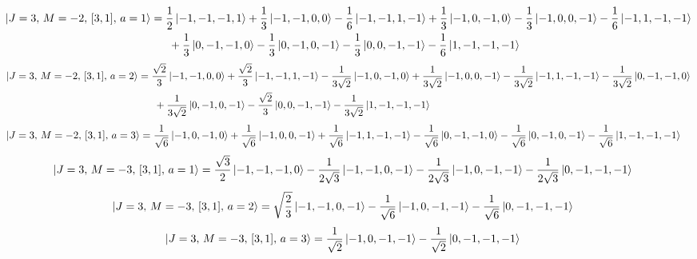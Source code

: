 \documentclass{article}
\begin{document}
{\small
\begin{equation*}
\begin{aligned}
\ket{J=3,\,M=-2,\,[3,1],\,a=1} = \; &\frac{1}{2} \ket{-1,-1,-1,1} + \frac{1}{3} \ket{-1,-1,0,0} - \frac{1}{6} \ket{-1,-1,1,-1} + \frac{1}{3} \ket{-1,0,-1,0} - \frac{1}{3} \ket{-1,0,0,-1} - \frac{1}{6} \ket{-1,1,-1,-1} \\
  & \; + \frac{1}{3} \ket{0,-1,-1,0} - \frac{1}{3} \ket{0,-1,0,-1} - \frac{1}{3} \ket{0,0,-1,-1} - \frac{1}{6} \ket{1,-1,-1,-1}
\end{aligned}
\end{equation*}}
{\small
\begin{equation*}
\begin{aligned}
\ket{J=3,\,M=-2,\,[3,1],\,a=2} = \; &\frac{\sqrt{2}}{3} \ket{-1,-1,0,0} + \frac{\sqrt{2}}{3} \ket{-1,-1,1,-1} - \frac{1}{3\sqrt{2}} \ket{-1,0,-1,0} + \frac{1}{3\sqrt{2}} \ket{-1,0,0,-1} - \frac{1}{3\sqrt{2}} \ket{-1,1,-1,-1} - \frac{1}{3\sqrt{2}} \ket{0,-1,-1,0} \\
  & \; + \frac{1}{3\sqrt{2}} \ket{0,-1,0,-1} - \frac{\sqrt{2}}{3} \ket{0,0,-1,-1} - \frac{1}{3\sqrt{2}} \ket{1,-1,-1,-1}
\end{aligned}
\end{equation*}}
\begin{equation*}
\begin{aligned}
\ket{J=3,\,M=-2,\,[3,1],\,a=3} = \; &\frac{1}{\sqrt{6}} \ket{-1,0,-1,0} + \frac{1}{\sqrt{6}} \ket{-1,0,0,-1} + \frac{1}{\sqrt{6}} \ket{-1,1,-1,-1} - \frac{1}{\sqrt{6}} \ket{0,-1,-1,0} - \frac{1}{\sqrt{6}} \ket{0,-1,0,-1} - \frac{1}{\sqrt{6}} \ket{1,-1,-1,-1}
\end{aligned}
\end{equation*}
\begin{equation*}
\begin{aligned}
\ket{J=3,\,M=-3,\,[3,1],\,a=1} = \; &\frac{\sqrt{3}}{2} \ket{-1,-1,-1,0} - \frac{1}{2\sqrt{3}} \ket{-1,-1,0,-1} - \frac{1}{2\sqrt{3}} \ket{-1,0,-1,-1} - \frac{1}{2\sqrt{3}} \ket{0,-1,-1,-1}
\end{aligned}
\end{equation*}
\begin{equation*}
\begin{aligned}
\ket{J=3,\,M=-3,\,[3,1],\,a=2} = \; &\sqrt{\frac{2}{3}} \ket{-1,-1,0,-1} - \frac{1}{\sqrt{6}} \ket{-1,0,-1,-1} - \frac{1}{\sqrt{6}} \ket{0,-1,-1,-1}
\end{aligned}
\end{equation*}
\begin{equation*}
\begin{aligned}
\ket{J=3,\,M=-3,\,[3,1],\,a=3} = \; &\frac{1}{\sqrt{2}} \ket{-1,0,-1,-1} - \frac{1}{\sqrt{2}} \ket{0,-1,-1,-1}
\end{aligned}
\end{equation*}
\end{document}

